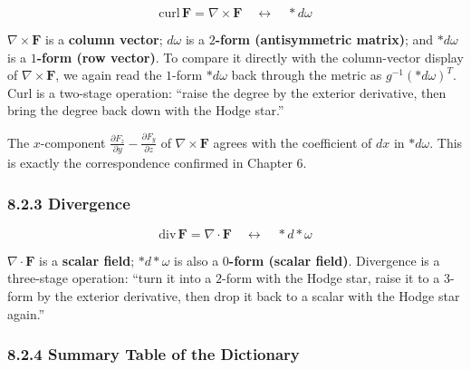 \[
\mathrm{curl}\,\mathbf{F} = \nabla \times \mathbf{F}
\quad\longleftrightarrow\quad
\ast d\omega
\]

\(\nabla\times\mathbf{F}\) is a \textbf{column vector}; \(d\omega\) is a
\textbf{$2$-form (antisymmetric matrix)}; and \(\ast d\omega\) is a
\textbf{$1$-form (row vector)}. To compare it directly with the
column-vector display of \(\nabla\times\mathbf F\), we again read the
\(1\)-form \(\ast d\omega\) back through the metric as
\(g^{-1}(\ast d\omega)^T\). Curl is a two-stage operation: ``raise the
degree by the exterior derivative, then bring the degree back down with
the Hodge star.''

The \(x\)-component
\(\frac{\partial F_z}{\partial y} - \frac{\partial F_y}{\partial z}\) of
\(\nabla\times\mathbf{F}\) agrees with the coefficient of \(dx\) in
\(\ast d\omega\). This is exactly the correspondence confirmed in
Chapter 6.

\hypertarget{divergence-1}{%
\subsubsection{8.2.3 Divergence}\label{divergence-1}}

\[
\mathrm{div}\,\mathbf{F} = \nabla \cdot \mathbf{F}
\quad\longleftrightarrow\quad
\ast d \ast \omega
\]

\(\nabla\cdot\mathbf{F}\) is a \textbf{scalar field};
\(\ast d\ast\omega\) is also a \textbf{$0$-form (scalar field)}.
Divergence is a three-stage operation: ``turn it into a \(2\)-form with
the Hodge star, raise it to a \(3\)-form by the exterior derivative,
then drop it back to a scalar with the Hodge star again.''

\hypertarget{summary-table-of-the-dictionary}{%
\subsubsection{8.2.4 Summary Table of the
Dictionary}\label{summary-table-of-the-dictionary}}

